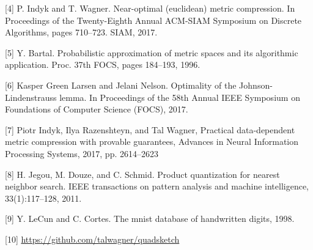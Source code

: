 \documentclass{article}
\begin{document}
[4] P. Indyk and T. Wagner. Near-optimal (euclidean) metric compression. In
Proceedings of the Twenty-Eighth Annual ACM-SIAM Symposium on Discrete
Algorithms, pages 710–723. SIAM, 2017.

[5] Y. Bartal. Probabilistic approximation of metric spaces and its algorithmic
application. Proc. 37th FOCS, pages 184–193, 1996.

[6] Kasper Green Larsen and Jelani Nelson. Optimality of the
Johnson-Lindenstrauss lemma. In Proceedings of the 58th Annual IEEE Symposium on
Foundations of Computer Science (FOCS), 2017.

[7] Piotr Indyk, Ilya Razenshteyn, and Tal Wagner, Practical data-dependent
metric compression with provable guarantees, Advances in Neural Information
Processing Systems, 2017, pp. 2614–2623

[8] H. Jegou, M. Douze, and C. Schmid. Product quantization for nearest neighbor
search. IEEE transactions on pattern analysis and machine intelligence,
33(1):117–128, 2011.

[9] Y. LeCun and C. Cortes. The mnist database of handwritten digits, 1998.

[10] \url{https://github.com/talwagner/quadsketch}
\end{document}
